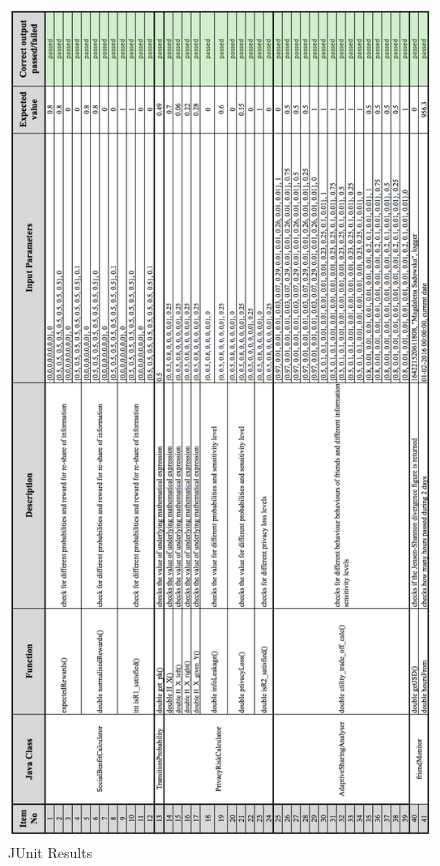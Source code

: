 \documentclass[a4paper,11pt]{article}
\begin{document}
\newpage
\begin{figure}[H]
	\hspace*{-0.0in}
	\includegraphics[width=1.0\textwidth,height=1.5\textwidth]{APpendix/tableResults2}
	\caption{JUnit Results}
\end{figure}
\end{document}
